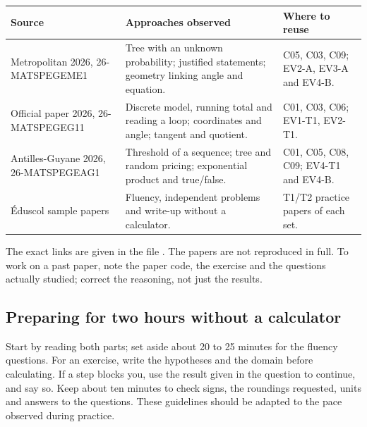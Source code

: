 \begin{longtable}{p{.22\linewidth}p{.38\linewidth}p{.29\linewidth}}
\toprule Source & Approaches observed & Where to reuse \\\midrule
Metropolitan 2026, 26-MATSPEGEME1 & Tree with an unknown probability; justified statements; geometry linking angle and equation. & C05, C03, C09; EV2-A, EV3-A and EV4-B.\\
Official paper 2026, 26-MATSPEGEG11 & Discrete model, running total and reading a loop; coordinates and angle; tangent and quotient. & C01, C03, C06; EV1-T1, EV2-T1.\\
Antilles-Guyane 2026, 26-MATSPEGEAG1 & Threshold of a sequence; tree and random pricing; exponential product and true/false. & C01, C05, C08, C09; EV4-T1 and EV4-B.\\
Éduscol sample papers & Fluency, independent problems and write-up without a calculator. & T1/T2 practice papers of each set.\\\bottomrule
\end{longtable}
The exact links are given in the file . The papers are not reproduced in full. To work on a past paper, note the paper code, the exercise and the questions actually studied; correct the reasoning, not just the results.

\subsection*{Preparing for two hours without a calculator}
Start by reading both parts; set aside about 20 to 25 minutes for the fluency questions. For an exercise, write the hypotheses and the domain before calculating. If a step blocks you, use the result given in the question to continue, and say so. Keep about ten minutes to check signs, the roundings requested, units and answers to the questions. These guidelines should be adapted to the pace observed during practice.
